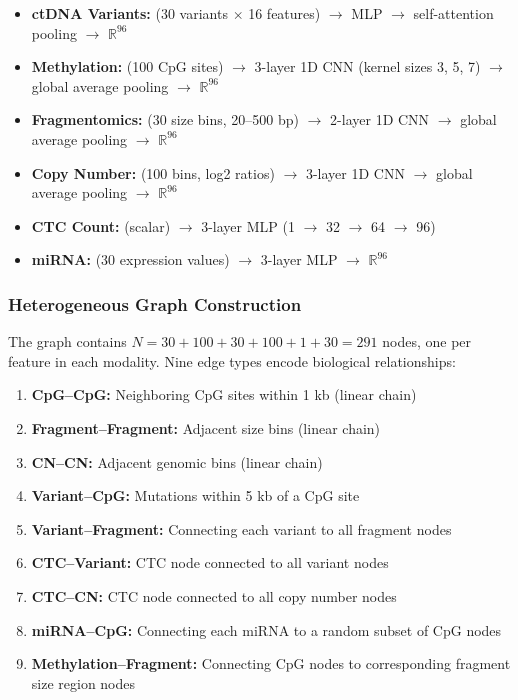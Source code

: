 \documentclass[10pt,a4paper]{article}
\begin{document}
\begin{itemize}
\item \textbf{ctDNA Variants:} (30 variants $\times$ 16 features) $\rightarrow$ MLP $\rightarrow$ self-attention pooling $\rightarrow$ $\mathbb{R}^{96}$
\item \textbf{Methylation:} (100 CpG sites) $\rightarrow$ 3-layer 1D CNN (kernel sizes 3, 5, 7) $\rightarrow$ global average pooling $\rightarrow$ $\mathbb{R}^{96}$
\item \textbf{Fragmentomics:} (30 size bins, 20--500 bp) $\rightarrow$ 2-layer 1D CNN $\rightarrow$ global average pooling $\rightarrow$ $\mathbb{R}^{96}$
\item \textbf{Copy Number:} (100 bins, log2 ratios) $\rightarrow$ 3-layer 1D CNN $\rightarrow$ global average pooling $\rightarrow$ $\mathbb{R}^{96}$
\item \textbf{CTC Count:} (scalar) $\rightarrow$ 3-layer MLP (1 $\rightarrow$ 32 $\rightarrow$ 64 $\rightarrow$ 96)
\item \textbf{miRNA:} (30 expression values) $\rightarrow$ 3-layer MLP $\rightarrow$ $\mathbb{R}^{96}$
\end{itemize}

\subsubsection{Heterogeneous Graph Construction}

The graph contains $N = 30 + 100 + 30 + 100 + 1 + 30 = 291$ nodes, one per feature in each modality. Nine edge types encode biological relationships:

\begin{enumerate}
\item \textbf{CpG--CpG:} Neighboring CpG sites within 1 kb (linear chain)
\item \textbf{Fragment--Fragment:} Adjacent size bins (linear chain)
\item \textbf{CN--CN:} Adjacent genomic bins (linear chain)
\item \textbf{Variant--CpG:} Mutations within 5 kb of a CpG site
\item \textbf{Variant--Fragment:} Connecting each variant to all fragment nodes
\item \textbf{CTC--Variant:} CTC node connected to all variant nodes
\item \textbf{CTC--CN:} CTC node connected to all copy number nodes
\item \textbf{miRNA--CpG:} Connecting each miRNA to a random subset of CpG nodes
\item \textbf{Methylation--Fragment:} Connecting CpG nodes to corresponding fragment size region nodes
\end{enumerate}
\end{document}
